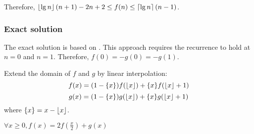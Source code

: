 Therefore, $\left\lfloor \lg n \right\rfloor(n+1) - 2n + 2 \le f(n) \le \left\lceil \lg n \right\rceil(n-1)$.

\subsubsection{Exact solution}

The exact solution is based on \cite{hwang:recurrence}.
This approach requires the recurrence to hold at $n=0$ and $n=1$.
Therefore, $f(0) = -g(0) = -g(1)$.

Extend the domain of $f$ and $g$ by linear interpolation:
\[ f(x) = (1-\{x\})f(\left\lfloor x \right\rfloor) + \{x\}f(\left\lfloor x \right\rfloor+1) \]
\[ g(x) = (1-\{x\})g(\left\lfloor x \right\rfloor) + \{x\}g(\left\lfloor x \right\rfloor+1) \]
where $\{x\} = x - \left\lfloor x \right\rfloor$.

\begin{theorem}
$\forall x \ge 0, f(x) = 2f(\frac{x}{2}) + g(x)$
\end{theorem}
